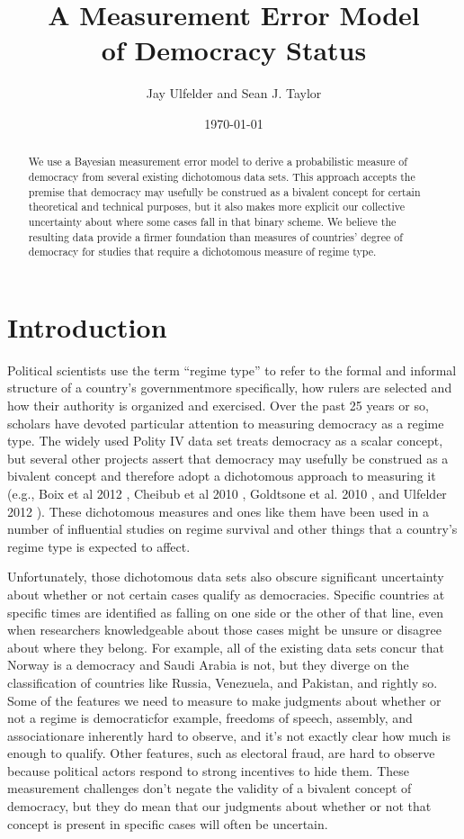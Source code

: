 \documentclass[letterpaper]{article}
\title{A Measurement Error Model \\of Democracy Status}
\author{Jay Ulfelder and Sean J. Taylor}
\date{\today}
\begin{document}
\maketitle

\begin{abstract}
We use a Bayesian measurement error model to derive a probabilistic measure of democracy from several existing dichotomous data sets. This approach accepts the premise that democracy may usefully be construed as a bivalent concept for certain theoretical and technical purposes, but it also makes more explicit our collective uncertainty about where some cases fall in that binary scheme. We believe the resulting data provide a firmer foundation than measures of countries' degree of democracy for studies that require a dichotomous measure of regime type.
\end{abstract}

\section{Introduction}

Political scientists use the term “regime type” to refer to the formal and informal structure of a country’s government\textendash more specifically, how rulers are selected and how their authority is organized and exercised. Over the past 25 years or so, scholars have devoted particular attention to measuring democracy as a regime type. The widely used Polity IV data set treats democracy as a scalar concept, but several other projects assert that democracy may usefully be construed as a bivalent concept and therefore adopt a dichotomous approach to measuring it (e.g., Boix et al 2012 \cite{boix}, Cheibub et al 2010 \cite{cheibub}, Goldtsone et al. 2010 \cite{pitf}, and Ulfelder 2012 \cite{ulfelder}). These dichotomous measures and ones like them have been used in a number of influential studies on regime survival and other things that a country’s regime type is expected to affect.

Unfortunately, those dichotomous data sets also obscure significant uncertainty about whether or not certain cases qualify as democracies. Specific countries at specific times are identified as falling on one side or the other of that line, even when researchers knowledgeable about those cases might be unsure or disagree about where they belong. For example, all of the existing data sets concur that Norway is a democracy and Saudi Arabia is not, but they diverge on the classification of countries like Russia, Venezuela, and Pakistan, and rightly so. Some of the features we need to measure to make judgments about whether or not a regime is democratic\textendash for example, freedoms of speech, assembly, and association\textendash are inherently hard to observe, and it’s not exactly clear how much is enough to qualify. Other features, such as electoral fraud, are hard to observe because political actors respond to strong incentives to hide them. These measurement challenges don’t negate the validity of a bivalent concept of democracy, but they do mean that our judgments about whether or not that concept is present in specific cases will often be uncertain.
\end{document}
